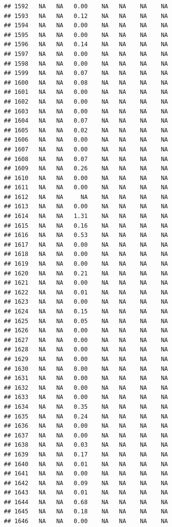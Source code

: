 \documentclass{article}\usepackage{graphicx, color}
\makeatletter
\newenvironment{kframe}{%
 \def\at@end@of@kframe{}%
 \ifinner\ifhmode%
  \def\at@end@of@kframe{\end{minipage}}%
  \begin{minipage}{\columnwidth}%
 \fi\fi%
 \def\FrameCommand##1{\hskip\@totalleftmargin \hskip-\fboxsep
 \colorbox{shadecolor}{##1}\hskip-\fboxsep
     \hskip-\linewidth \hskip-\@totalleftmargin \hskip\columnwidth}%
 \MakeFramed {\advance\hsize-\width
   \@totalleftmargin\z@ \linewidth\hsize
   \@setminipage}}%
 {\par\unskip\endMakeFramed%
 \at@end@of@kframe}
\newenvironment{knitrout}{}{} %
\makeatother
\begin{document}
\begin{knitrout}
\begin{kframe}
\begin{verbatim}
## 1592   NA   NA   0.00    NA   NA    NA    NA
## 1593   NA   NA   0.12    NA   NA    NA    NA
## 1594   NA   NA   0.00    NA   NA    NA    NA
## 1595   NA   NA   0.00    NA   NA    NA    NA
## 1596   NA   NA   0.14    NA   NA    NA    NA
## 1597   NA   NA   0.00    NA   NA    NA    NA
## 1598   NA   NA   0.00    NA   NA    NA    NA
## 1599   NA   NA   0.07    NA   NA    NA    NA
## 1600   NA   NA   0.08    NA   NA    NA    NA
## 1601   NA   NA   0.00    NA   NA    NA    NA
## 1602   NA   NA   0.00    NA   NA    NA    NA
## 1603   NA   NA   0.00    NA   NA    NA    NA
## 1604   NA   NA   0.07    NA   NA    NA    NA
## 1605   NA   NA   0.02    NA   NA    NA    NA
## 1606   NA   NA   0.00    NA   NA    NA    NA
## 1607   NA   NA   0.00    NA   NA    NA    NA
## 1608   NA   NA   0.07    NA   NA    NA    NA
## 1609   NA   NA   0.26    NA   NA    NA    NA
## 1610   NA   NA   0.00    NA   NA    NA    NA
## 1611   NA   NA   0.00    NA   NA    NA    NA
## 1612   NA   NA     NA    NA   NA    NA    NA
## 1613   NA   NA   0.00    NA   NA    NA    NA
## 1614   NA   NA   1.31    NA   NA    NA    NA
## 1615   NA   NA   0.16    NA   NA    NA    NA
## 1616   NA   NA   0.53    NA   NA    NA    NA
## 1617   NA   NA   0.00    NA   NA    NA    NA
## 1618   NA   NA   0.00    NA   NA    NA    NA
## 1619   NA   NA   0.00    NA   NA    NA    NA
## 1620   NA   NA   0.21    NA   NA    NA    NA
## 1621   NA   NA   0.00    NA   NA    NA    NA
## 1622   NA   NA   0.01    NA   NA    NA    NA
## 1623   NA   NA   0.00    NA   NA    NA    NA
## 1624   NA   NA   0.15    NA   NA    NA    NA
## 1625   NA   NA   0.05    NA   NA    NA    NA
## 1626   NA   NA   0.00    NA   NA    NA    NA
## 1627   NA   NA   0.00    NA   NA    NA    NA
## 1628   NA   NA   0.00    NA   NA    NA    NA
## 1629   NA   NA   0.00    NA   NA    NA    NA
## 1630   NA   NA   0.00    NA   NA    NA    NA
## 1631   NA   NA   0.00    NA   NA    NA    NA
## 1632   NA   NA   0.00    NA   NA    NA    NA
## 1633   NA   NA   0.00    NA   NA    NA    NA
## 1634   NA   NA   0.35    NA   NA    NA    NA
## 1635   NA   NA   0.24    NA   NA    NA    NA
## 1636   NA   NA   0.00    NA   NA    NA    NA
## 1637   NA   NA   0.00    NA   NA    NA    NA
## 1638   NA   NA   0.03    NA   NA    NA    NA
## 1639   NA   NA   0.17    NA   NA    NA    NA
## 1640   NA   NA   0.01    NA   NA    NA    NA
## 1641   NA   NA   0.00    NA   NA    NA    NA
## 1642   NA   NA   0.09    NA   NA    NA    NA
## 1643   NA   NA   0.01    NA   NA    NA    NA
## 1644   NA   NA   0.68    NA   NA    NA    NA
## 1645   NA   NA   0.18    NA   NA    NA    NA
## 1646   NA   NA   0.00    NA   NA    NA    NA

\end{verbatim}
\end{kframe}
\end{knitrout}
\end{document}
